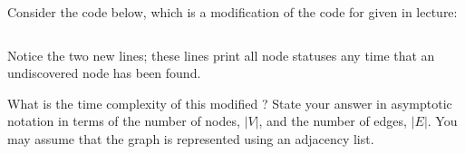 \begin{prob}
    Consider the code below, which is a modification of the code for
     given in lecture:

    \inputminted{python}{\thisdir/code.py}

    Notice the two new lines; these lines print all node statuses any time that
    an undiscovered node has been found.

    What is the time complexity of this modified ?
    State your answer in asymptotic notation in terms of the number of nodes,
    $|V|$, and the number of edges, $|E|$. You may assume that the graph is
    represented using an adjacency list.


\end{prob}
